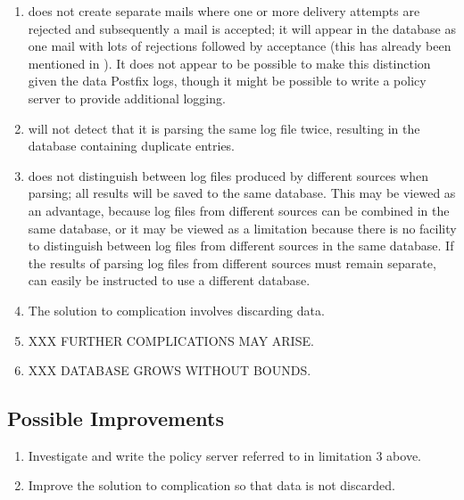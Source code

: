 \begin{enumerate}
    \item \parsername{} does not create separate mails where one or more
        delivery attempts are rejected and subsequently a mail is accepted;
        it will appear in the database as one mail with lots of rejections
        followed by acceptance (this has already been mentioned in
        ).  It does not appear to be possible
        to make this distinction given the data Postfix logs, though it
        might be possible to write a policy server to provide additional
        logging.

    \item \parsername{} will not detect that it is parsing the same log file
        twice, resulting in the database containing duplicate entries.

    \item \parsername{} does not distinguish between log files produced by
        different sources when parsing; all results will be saved to the
        same database.  This may be viewed as an advantage, because log
        files from different sources can be combined in the same database,
        or it may be viewed as a limitation because there is no facility to
        distinguish between log files from different sources in the same
        database.  If the results of parsing log files from different
        sources must remain separate, \parsername{} can easily be
        instructed to use a different database.

    \item The solution to complication  involves discarding data.

    \item XXX FURTHER COMPLICATIONS MAY ARISE\@.

    \item XXX DATABASE GROWS WITHOUT BOUNDS\@.

\end{enumerate}

\subsection{Possible Improvements}

\begin{enumerate}

    \item Investigate and write the policy server referred to in limitation
        3 above.

    \item Improve the solution to complication  so that data is not discarded.

\end{enumerate}


